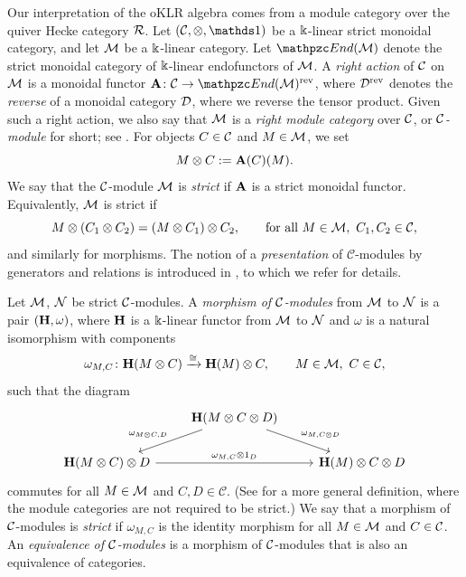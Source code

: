 Our interpretation of the oKLR algebra comes from a module category over the quiver Hecke category $\mathcal{R}$. Let $(\cC,\otimes,\one )$ be a $\Bbbk$-linear strict monoidal category, and let $\mathcal{M}$ be a $\Bbbk$-linear category.  Let $\cEnd(\cM)$ denote the strict monoidal category of $\Bbbk$-linear endofunctors of $\mathcal{M}$.  A \emph{right action} of $\mathcal{C}$ on $\mathcal{M}$ is a monoidal functor $\bA \colon \cC \to \cEnd(\cM)^\rev$, where $\mathcal{D}^{\textup{rev}}$ denotes the \emph{reverse} of a monoidal category $\mathcal{D}$, where we reverse the tensor product.  Given such a right action, we also say that $\mathcal{M}$ is a \emph{right module category} over $\mathcal{C}$, or \emph{$\mathcal{C}$-module} for short; see \cite[Section 7.1]{ENGO15}.  For objects $C \in \mathcal{C}$ and $M \in \mathcal{M}$, we set
\begin{equation} \label{beaver}
    M \otimes C := \mathbf{A}(C)(M).
\end{equation}
We say that the $\mathcal{C}$-module $\mathcal{M}$ is \emph{strict} if $\mathbf{A}$ is a strict monoidal functor.  Equivalently, $\mathcal{M}$ is strict if
\[
    M \otimes (C_1 \otimes C_2) = (M \otimes C_1) \otimes C_2,\qquad
    \text{for all } M \in \mathcal{M},\ C_1,C_2 \in \mathcal{C},
\]
and similarly for morphisms. The notion of a \emph{presentation} of $\mathcal{C}$-modules by generators and relations is introduced in \cite[Sect.~2.2]{SSS25}, to which we refer for details. 

Let $\mathcal{M}$, $\mathcal{N}$ be strict $\mathcal{C}$-modules.  A \emph{morphism of $\mathcal{C}$-modules} from $\mathcal{M}$ to $\mathcal{N}$ is a pair $(\mathbf{H},\omega)$, where $\mathbf{H}$ is a $\Bbbk$-linear functor from $\mathcal{M}$ to $\mathcal{N}$ and $\omega$ is a natural isomorphism with components
\[
    \omega_{M,C} \colon \mathbf{H}(M \otimes C) \xrightarrow{\cong} \mathbf{H}(M) \otimes C,\qquad M \in \mathcal{M},\ C \in \mathcal{C},
\]
such that the diagram
\begin{equation} \label{buffalo}
    \begin{tikzcd}
        & \bH (M \otimes C \otimes D) \arrow[dl,"\omega_{M \otimes C, D}"'] \ar[dr,"\omega_{M, C \otimes D}"] &
        \\
        \bH(M \otimes C) \otimes D \arrow[rr,"\omega_{M,C} \otimes 1_D"] & & \bH(M) \otimes C \otimes D
    \end{tikzcd}
\end{equation}
commutes for all $M \in \mathcal{M}$ and $C,D \in \mathcal{C}$.  (See \cite[Def.~7.2.1]{ENGO15} for a more general definition, where the module categories are not required to be strict.)  We say that a morphism of $\mathcal{C}$-modules is \emph{strict} if $\omega_{M,C}$ is the identity morphism for all $M \in \mathcal{M}$ and $C \in \mathcal{C}$.  An \emph{equivalence of $\mathcal{C}$-modules} is a morphism of $\mathcal{C}$-modules that is also an equivalence of categories.


